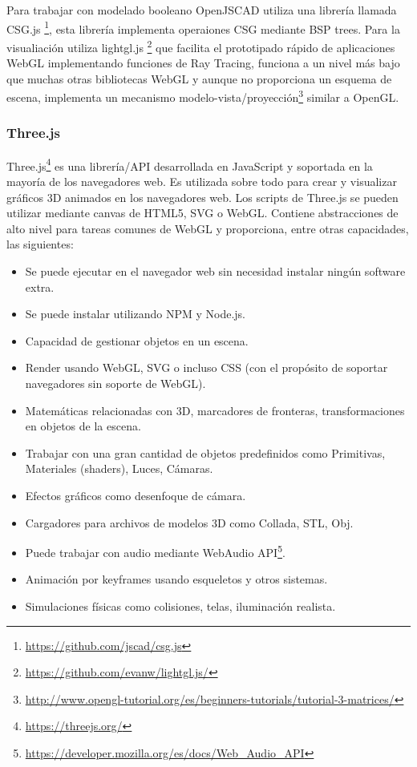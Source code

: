 Para trabajar con modelado booleano OpenJSCAD utiliza una librería llamada CSG.js \footnote{\url{https://github.com/jscad/csg.js}}, esta librería implementa operaiones CSG mediante BSP trees. Para la visualiación utiliza lightgl.js \footnote{\url{https://github.com/evanw/lightgl.js/}} que facilita el prototipado rápido de aplicaciones WebGL implementando funciones de Ray Tracing, funciona a un nivel más bajo que muchas otras bibliotecas WebGL y aunque no proporciona un esquema de escena, implementa un mecanismo modelo-vista/proyección\footnote{\url{http://www.opengl-tutorial.org/es/beginners-tutorials/tutorial-3-matrices/}} similar a OpenGL.

\subsubsection{Three.js
}

Three.js\footnote{\url{https://threejs.org/}} es una librería/API desarrollada en JavaScript y soportada en la mayoría de los navegadores web. Es utilizada sobre todo para crear y visualizar gráficos 3D animados en los navegadores web. Los scripts de Three.js se pueden utilizar mediante canvas de HTML5, SVG o WebGL. Contiene abstracciones de alto nivel para tareas comunes de WebGL y proporciona, entre otras capacidades, las siguientes:

\begin{itemize}
    \item Se puede ejecutar en el navegador web sin necesidad instalar ningún software extra.
    \item Se puede instalar utilizando NPM y Node.js.
    \item Capacidad de gestionar objetos en un escena.
    \item Render usando WebGL, SVG o incluso CSS (con el propósito de soportar navegadores sin soporte de WebGL).
    \item Matemáticas relacionadas con 3D, marcadores de fronteras, transformaciones en objetos de la escena.
    \item Trabajar con una gran cantidad de objetos predefinidos como Primitivas, Materiales (shaders), Luces, Cámaras.
    \item Efectos gráficos como desenfoque de cámara.
    \item Cargadores para archivos de modelos 3D como Collada, STL, Obj.
    \item Puede trabajar con audio mediante WebAudio API\footnote{\url{https://developer.mozilla.org/es/docs/Web_Audio_API}}.
    \item Animación por keyframes usando esqueletos y otros sistemas.
    \item Simulaciones físicas como colisiones, telas, iluminación realista.
\end{itemize} 

